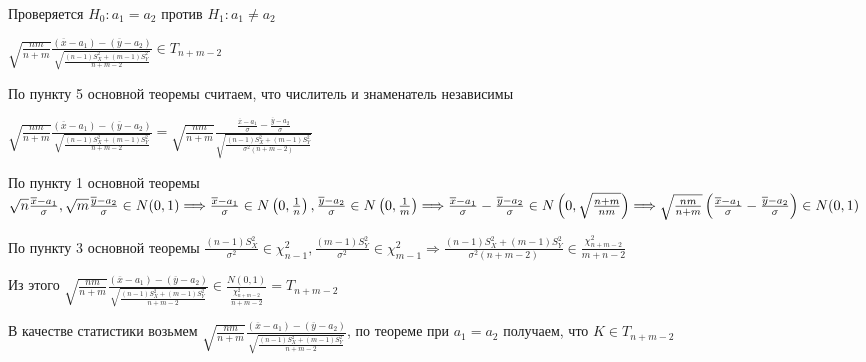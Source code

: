 \documentclass[12pt]{article}
\begin{document}
\begin{enumerate}[label*=\Roman*. ]
    Проверяется $H_0 : a_1 = a_2$ против $H_1 : a_1 \neq a_2$

    \begin{MyTheorem}
        \Ths $\sqrt{\frac{nm}{n + m}} \frac{(\overline x - a_1) - (\overline y - a_2)}{\sqrt{\frac{(n - 1) S_X^2 + (m - 1) S^2_Y}{n + m - 2}}} \in T_{n + m - 2}$
    \end{MyTheorem}

    \begin{MyProof}
        По пункту 5 основной теоремы считаем, что числитель и знаменатель независимы 

        $\sqrt{\frac{nm}{n + m}} \frac{(\overline x - a_1) - (\overline y - a_2)}{\sqrt{\frac{(n - 1) S_X^2 + (m - 1) S^2_Y}{n + m - 2}}} = 
        \sqrt{\frac{nm}{n + m}} \frac{\frac{\overline x - a_1}{\sigma} - \frac{\overline y - a_2}{\sigma}}{\sqrt{\frac{(n - 1) S_X^2 + (m - 1) S^2_Y}{\sigma^2 (n + m - 2)}}}$

        По пункту 1 основной теоремы $\sqrt{n} \frac{\overline x - a_1}{\sigma}, \sqrt{m} \frac{\overline y - a_2}{\sigma} \in N(0, 1) \Longrightarrow \\
        \frac{\overline x - a_1}{\sigma} \in N\left(0, \frac{1}{n}\right), \frac{\overline y - a_2}{\sigma} \in N\left(0, \frac{1}{m}\right) \Longrightarrow \\
        \frac{\overline x - a_1}{\sigma} - \frac{\overline y - a_2}{\sigma} \in N\left(0, \sqrt{\frac{n + m}{nm}}\right) \Longrightarrow \\
        \sqrt{\frac{nm}{n + m}} \left(\frac{\overline x - a_1}{\sigma} - \frac{\overline y - a_2}{\sigma}\right) \in N(0, 1)$

        По пункту 3 основной теоремы $\frac{(n - 1)S^2_X}{\sigma^2} \in \chi^2_{n - 1}, \frac{(m - 1)S^2_Y}{\sigma^2} \in \chi^2_{m - 1} \Longrightarrow
        \frac{(n - 1) S_X^2 + (m - 1) S^2_Y}{\sigma^2 (n + m - 2)} \in \frac{\chi^2_{n + m - 2}}{m + n - 2}$

        Из этого $\sqrt{\frac{nm}{n + m}} \frac{(\overline x - a_1) - (\overline y - a_2)}{\sqrt{\frac{(n - 1) S_X^2 + (m - 1) S^2_Y}{n + m - 2}}} \in \frac{N(0, 1)}{\frac{\chi^2_{n + m - 2}}{n + m - 2}} = T_{n + m - 2}$
    \end{MyProof}

    В качестве статистики возьмем $\sqrt{\frac{nm}{n + m}} \frac{(\overline x - a_1) - (\overline y - a_2)}{\sqrt{\frac{(n - 1) S_X^2 + (m - 1) S^2_Y}{n + m - 2}}}$, 
    по теореме при $a_1 = a_2$ получаем, что $K \in T_{n + m - 2}$


\end{enumerate}
\end{document}
